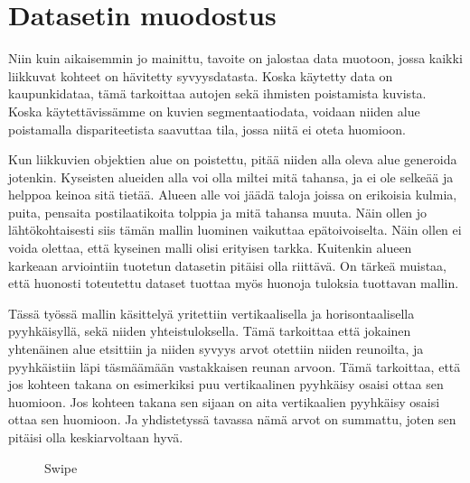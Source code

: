 \section{Datasetin muodostus}

Niin kuin aikaisemmin jo mainittu, tavoite on jalostaa data muotoon, jossa kaikki liikkuvat kohteet on hävitetty syvyysdatasta.
Koska käytetty data on kaupunkidataa, tämä tarkoittaa autojen sekä ihmisten poistamista kuvista.
Koska käytettävissämme on kuvien segmentaatiodata, voidaan niiden alue poistamalla dispariteetista saavuttaa tila, jossa niitä ei oteta huomioon.

Kun liikkuvien objektien alue on poistettu, pitää niiden alla oleva alue generoida jotenkin. 
Kyseisten alueiden alla voi olla miltei mitä tahansa, 
ja ei ole selkeää ja helppoa keinoa sitä tietää. 
Alueen alle voi jäädä taloja joissa on erikoisia kulmia, puita, pensaita postilaatikoita tolppia ja mitä tahansa muuta. 
Näin ollen jo lähtökohtaisesti siis tämän mallin luominen vaikuttaa epätoivoiselta.
Näin ollen ei voida olettaa, että kyseinen malli olisi erityisen tarkka.
Kuitenkin alueen karkeaan arviointiin tuotetun datasetin pitäisi olla riittävä.
On tärkeä muistaa, että huonosti toteutettu dataset tuottaa myös huonoja tuloksia tuottavan mallin.

Tässä työssä mallin käsittelyä yritettiin vertikaalisella ja horisontaalisella pyyhkäisyllä, sekä niiden yhteistuloksella.
Tämä tarkoittaa että jokainen yhtenäinen alue etsittiin ja niiden syvyys arvot otettiin niiden reunoilta, ja pyyhkäistiin läpi täsmäämään vastakkaisen reunan arvoon.
Tämä tarkoittaa, että jos kohteen takana on esimerkiksi puu vertikaalinen pyyhkäisy osaisi ottaa sen huomioon.
Jos kohteen takana sen sijaan on aita vertikaalien pyyhkäisy osaisi ottaa sen huomioon.
Ja yhdistetyssä tavassa nämä arvot on summattu, joten sen pitäisi olla keskiarvoltaan hyvä. 

\begin{figure}[h]
\centering
{}
\caption{Swipe}
\label{fig:swipe}
\end{figure}


